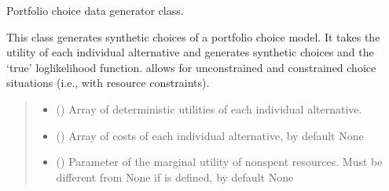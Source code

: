 \documentclass[a4paper,10pt,english]{sphinxhowto}
\begin{document}
\begin{fulllineitems}
\label{\detokenize{generated/portchoice.generate:portchoice.generate.PortGen}}
\pysigstartsignatures
{}
\pysigstopsignatures
\sphinxAtStartPar
Portfolio choice data generator class.

\sphinxAtStartPar
This class generates synthetic choices of a portfolio choice model. It
takes the utility of each individual alternative and generates synthetic
choices and the ‘true’ log\sphinxhyphen{}likelihood function.  allows for
unconstrained and constrained choice situations (i.e., with resource
constraints).
\begin{quote}\begin{description}
\begin{itemize}
\item {} 
\sphinxAtStartPar
{} () \textendash{} Array of deterministic utilities of each individual alternative.

\item {} 
\sphinxAtStartPar
{} (\sphinxstyleliteralemphasis{\sphinxupquote{, }}) \textendash{} Array of costs of each individual alternative, by default None

\item {} 
\sphinxAtStartPar
{} (\sphinxstyleliteralemphasis{\sphinxupquote{, }}) \textendash{} Parameter of the marginal utility of non\sphinxhyphen{}spent resources. Must be
different from None if  is defined, by default None


\end{itemize}
\end{description}
\end{quote}
\end{fulllineitems}
\end{document}
